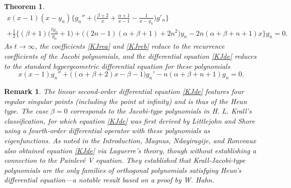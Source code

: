 \documentclass[10pt, reqno]{amsart}
\numberwithin{equation}{section}
\newtheorem{theorem}{Theorem}[section]
\newtheorem{remark}{Remark}[section]
\numberwithin{equation}{section}
\begin{document}
\begin{theorem}
\begin{multline}
x(x-1)(x-y_n)\Big\{g_n''+\Big(\frac{\beta+2}{x}+\frac{\alpha+1}{x-1}-\frac{1}{x-y_n}\Big)g'_n\Big\}\\
+\frac{1}{2}\Big\{(\beta+1)\Big(\frac{t\dot{y}_n}{y_n}+1\Big)+\big((2n-1)(\alpha+\beta+1)+2n^2\big)y_n-2n(\alpha+\beta+n+1)x\Big\}g_n=0.
\end{multline}
As $t\to\infty$, the coefficients \eqref{KJrea} and \eqref{KJreb} reduce to the recurrence coefficients of the Jacobi polynomials, and the differential equation \eqref{KJde} reduces to the standard hypergeometric differential equation for these polynomials
\begin{equation}
x(x-1)g_n''+\big((\alpha+\beta+2)x-\beta-1\big)g_n'-n(\alpha+\beta+n+1)g_n=0.\label{Jde}
\end{equation}
\end{theorem}
\begin{remark}\label{remark 4.1}
\emph{The linear second-order differential equation \eqref{KJde} features four regular singular points (including the point at infinity) and is thus of the Heun type. The case \(\beta = 0\) corresponds to the Jacobi-type polynomials in H. L. Krall’s classification, for which equation \eqref{KJde} was first derived by Littlejohn and Shore \cite{LLS} using a fourth-order differential operator with these polynomials as eigenfunctions. As noted in the Introduction, Magnus, Ndayiragije, and Ronveaux \cite{MNR} also obtained equation \eqref{KJde} via Laguerre’s theory, though without establishing a connection to the Painlevé V equation. They established that Krall-Jacobi-type polynomials are the only families of orthogonal polynomials satisfying Heun's differential equation\;---\;a notable result based on a proof by W. Hahn.}
\end{remark}
\end{document}
